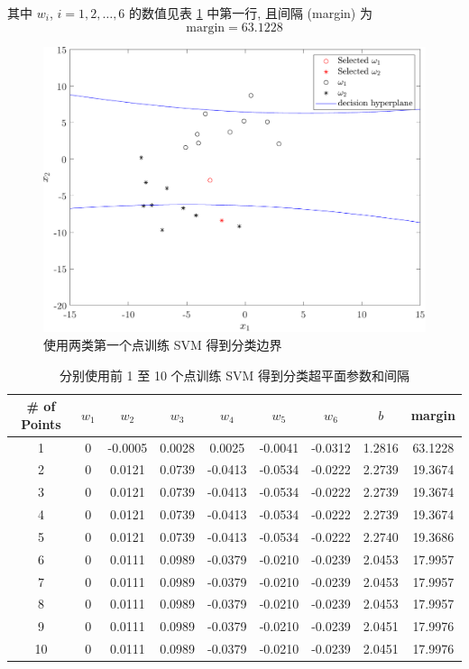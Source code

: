 \documentclass{article}
\begin{document}
其中 $w_i$, $i=1,2,\dots,6$ 的数值见表 \ref{tab:svm} 中第一行, 且间隔 (margin) 为
\begin{equation}
  \mathrm{margin}=63.1228
\end{equation}

\begin{figure}[htbp]
  \centering
  \includegraphics[width=16cm]{svmPoint1.pdf}
  \caption{使用两类第一个点训练 SVM 得到分类边界}
  \label{fig:svm1}
\end{figure}

\begin{table}[htbp]
  \centering
  \caption{分别使用前 1 至 10 个点训练 SVM 得到分类超平面参数和间隔}
  \label{tab:svm}
  \begin{tabular}{ccccccccc}
    \hline
    \# of Points & $w_1$ & $w_2$   & $w_3$  & $w_4$   & $w_5$   & $w_6$   & $b$    & margin  \\
    \hline
    1   & 0     & -0.0005 & 0.0028 & 0.0025  & -0.0041 & -0.0312 & 1.2816 & 63.1228 \\
    2   & 0     & 0.0121  & 0.0739 & -0.0413 & -0.0534 & -0.0222 & 2.2739 & 19.3674 \\
    3   & 0     & 0.0121  & 0.0739 & -0.0413 & -0.0534 & -0.0222 & 2.2739 & 19.3674 \\
    4   & 0     & 0.0121  & 0.0739 & -0.0413 & -0.0534 & -0.0222 & 2.2739 & 19.3674 \\
    5   & 0     & 0.0121  & 0.0739 & -0.0413 & -0.0534 & -0.0222 & 2.2740 & 19.3686 \\
    6   & 0     & 0.0111  & 0.0989 & -0.0379 & -0.0210 & -0.0239 & 2.0453 & 17.9957 \\
    7   & 0     & 0.0111  & 0.0989 & -0.0379 & -0.0210 & -0.0239 & 2.0453 & 17.9957 \\
    8   & 0     & 0.0111  & 0.0989 & -0.0379 & -0.0210 & -0.0239 & 2.0453 & 17.9957 \\
    9   & 0     & 0.0111  & 0.0989 & -0.0379 & -0.0210 & -0.0239 & 2.0451 & 17.9976 \\
    10  & 0     & 0.0111  & 0.0989 & -0.0379 & -0.0210 & -0.0239 & 2.0451 & 17.9976\\
    \hline
  \end{tabular}
\end{table}
\end{document}
